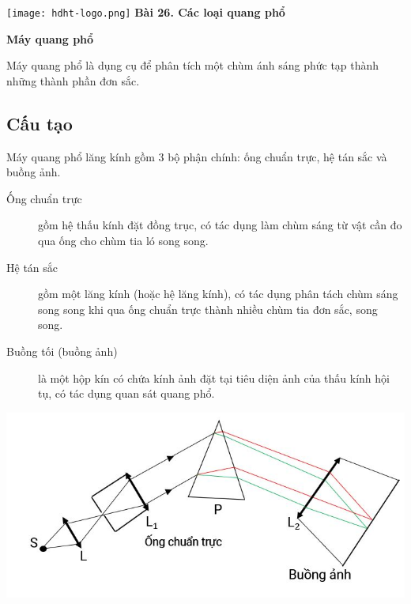 \newcommand{\chapter}[2][]{
	\newcommand{\chapname}{#2}
	\begin{flushleft}
		\begin{minipage}[t]{\linewidth}
			\texttt{[image: hdht-logo.png]}
			\hspace{0pt}	
			\sffamily\bfseries\large Bài  26. Các loại quang phổ
			\begin{flushleft}
				\huge\bfseries #1
			\end{flushleft}
		\end{minipage}
	\end{flushleft}
	\vspace{1cm}
	\normalfont\normalsize
}
\chapter[Máy quang phổ]{Máy quang phổ}


Máy quang phổ là dụng cụ để phân tích một chùm ánh sáng phức tạp thành những thành phần đơn sắc.
\subsection{Cấu tạo}
Máy quang phổ lăng kính gồm 3 bộ phận chính: ống chuẩn trực, hệ tán sắc và buồng ảnh.
\begin{description}
	\item[Ống chuẩn trực] gồm hệ thấu kính đặt đồng trục, có tác dụng làm chùm sáng từ vật cần đo qua ống cho chùm tia ló song song.
	\item[Hệ tán sắc] gồm một lăng kính (hoặc hệ lăng kính), có tác dụng phân tách chùm sáng song song khi qua ống chuẩn trực thành nhiều chùm tia đơn sắc, song song.
	\item[Buồng tối (buồng ảnh)] là một hộp kín có chứa kính ảnh đặt tại tiêu diện ảnh của thấu kính hội tụ, có tác dụng quan sát quang phổ.
\end{description} 	
	\begin{center}
		\includegraphics[scale=1]{../figs/VN12-PH-36-L-021-1-1.JPG}
	\end{center}
